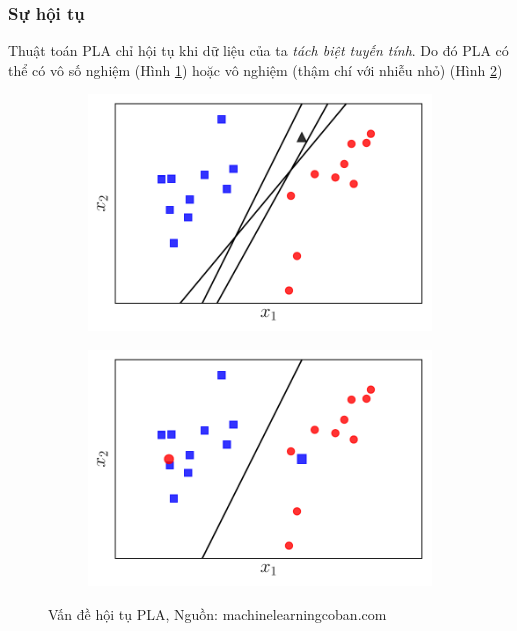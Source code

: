 \documentclass{article}
\begin{document}
 \subsubsection*{Sự hội tụ}
 Thuật toán PLA chỉ hội tụ khi dữ liệu của ta \textit{tách biệt tuyến tính}. Do đó PLA có thể có vô số nghiệm (Hình \ref{fig10a}) hoặc vô nghiệm (thậm chí với nhiễu nhỏ) (Hình \ref{fig10b})
 \begin{figure}[ht!]
    \centering
    \begin{subfigure}[b]{0.45\linewidth}
        \includegraphics[width = \linewidth]{pla6.pdf}
        \caption{}
        \label{fig10a}
    \end{subfigure}
    \begin{subfigure}[b]{0.45\linewidth}
        \includegraphics[width = \linewidth]{pla7.pdf}
        \caption{}
        \label{fig10b}
    \end{subfigure}
    \caption{Vấn đề hội tụ PLA, Nguồn: machinelearningcoban.com}
    \label{fig10}
\end{figure}
\end{document}
